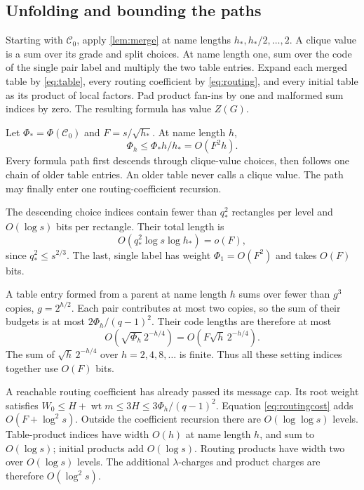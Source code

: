 \documentclass[11pt]{article}
\theoremstyle{definition}
\theoremstyle{remark}
\newcommand{\wt}{\operatorname{wt}}
\begin{document}
\subsection{Unfolding and bounding the paths}\label{sec:paths}

Starting with $\mathcal C_0$, apply \cref{lem:merge} at name lengths $h_*,h_*/2,\ldots,2$. A clique value is a sum over its grade and split choices. At name length one, sum over the code of the single pair label and multiply the two table entries. Expand each merged table by \eqref{eq:table}, every routing coefficient by \eqref{eq:routing}, and every initial table as its product of local factors. Pad product fan-ins by one and malformed sum indices by zero. The resulting formula has value $Z(G)$.

Let $\Phi_*=\Phi(\mathcal C_0)$ and $F=s/\sqrt{h_*}$. At name length $h$,
\begin{equation}\label{eq:phih}
 \Phi_h\le\Phi_*h/h_*=O(F^2h).
\end{equation}
Every formula path first descends through clique-value choices, then follows one chain of older table entries. An older table never calls a clique value. The path may finally enter one routing-coefficient recursion.

The descending choice indices contain fewer than $q_*^2$ rectangles per level and $O(\log s)$ bits per rectangle. Their total length is
\[
 O(q_*^2\log s\log h_*)=o(F),
\]
since $q_*^2\le s^{2/3}$. The last, single label has weight $\Phi_1=O(F^2)$ and takes $O(F)$ bits.

A table entry formed from a parent at name length $h$ sums over fewer than $g^3$ copies, $g=2^{h/2}$. Each pair contributes at most two copies, so the sum of their budgets is at most $2\Phi_h/(q-1)^2$. Their code lengths are therefore at most
\begin{equation}\label{eq:rowlength}
 O\!\left(\sqrt{\Phi_h}\,2^{-h/4}\right)
 =O\!\left(F\sqrt h\,2^{-h/4}\right).
\end{equation}
The sum of $\sqrt h\,2^{-h/4}$ over $h=2,4,8,\ldots$ is finite. Thus all these setting indices together use $O(F)$ bits.

A reachable routing coefficient has already passed its message cap. Its root weight satisfies $W_0\le H+\wt m\le3H\le3\Phi_h/(q-1)^2$. Equation \eqref{eq:routingcost} adds $O(F+\log^2s)$. Outside the coefficient recursion there are $O(\log\log s)$ levels. Table-product indices have width $O(h)$ at name length $h$, and sum to $O(\log s)$; initial products add $O(\log s)$. Routing products have width two over $O(\log s)$ levels. The additional $\lambda$-charges and product charges are therefore $O(\log^2s)$.
\end{document}
